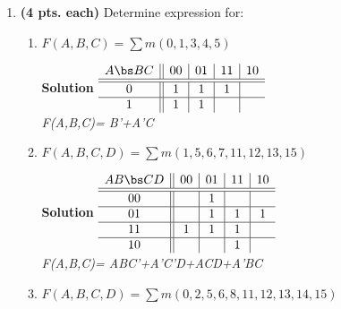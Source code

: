 \begin{enumerate}
    \item \textbf{ (4 pts. each)} Determine \SOPmin expression for:
        \begin{enumerate}
            \item $F(A,B,C)=\sum m(0,1,3,4,5)$

                \begin{onlysolution}  \textbf{Solution} \itshape{
                        $
                        \begin{array} {c||c|c|c|c}
                            A   \bs B C  & 00 & 01 & 11 & 10 \\ \hline \hline
                            0        &  1 & 1  & 1  &    \\ \hline
                            1        &  1 & 1  &    &    \\
                        \end{array}$ \\
                        F(A,B,C)= B'+A'C
                    }
                \end{onlysolution}
            \item $F(A,B,C,D)=\sum m(1,5,6,7,11,12,13,15)$

                \begin{onlysolution}  \textbf{Solution} \itshape{
                        $
                        \begin{array} {c||c|c|c|c}
                            A B \bs C D   & 00 & 01 & 11 & 10 \\ \hline \hline
                            00        &    & 1  &    &    \\ \hline
                            01        &    & 1  & 1  & 1  \\ \hline
                            11        & 1  & 1  & 1  &    \\ \hline
                            10        &    &    & 1  &    \\
                        \end{array}$  \\
                        F(A,B,C)= ABC'+A'C'D+ACD+A'BC
                    }
                \end{onlysolution}
            \item $F(A,B,C,D)=\sum m(0,2,5,6,8,11,12,13,14,15)$


\end{enumerate}
\end{enumerate}
